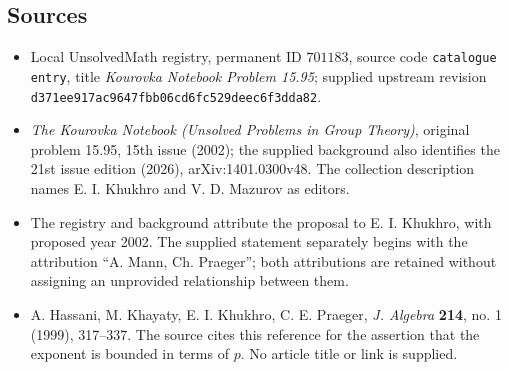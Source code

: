 \documentclass[11pt]{article}
\begin{document}
\subsection{Sources}
\begin{itemize}
\item Local UnsolvedMath registry, permanent ID \(701183\), source code \texttt{catalogue entry}, title \emph{Kourovka Notebook Problem 15.95}; supplied upstream revision \texttt{d371ee917ac9647fbb06cd6fc529deec6f3dda82}.
\item \emph{The Kourovka Notebook (Unsolved Problems in Group Theory)}, original problem 15.95, 15th issue (2002); the supplied background also identifies the 21st issue edition (2026), arXiv:1401.0300v48. The collection description names E. I. Khukhro and V. D. Mazurov as editors.
\item The registry and background attribute the proposal to E. I. Khukhro, with proposed year 2002. The supplied statement separately begins with the attribution ``A. Mann, Ch. Praeger''; both attributions are retained without assigning an unprovided relationship between them.
\item A. Hassani, M. Khayaty, E. I. Khukhro, C. E. Praeger, \emph{J. Algebra} \textbf{214}, no. 1 (1999), 317--337. The source cites this reference for the assertion that the exponent is bounded in terms of \(p\). No article title or link is supplied.
\end{itemize}
\end{document}
